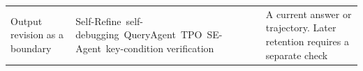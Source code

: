 \begin{longtable}{@{}>{\raggedright\arraybackslash}p{}>{\raggedright\arraybackslash}p{}>{\raggedright\arraybackslash}p{}@{}}
\addlinespace[8pt]
Output revision as a boundary & Self-Refine~\citep{madaan2023selfrefine}\newline self-debugging~\citep{chen2024teaching}\newline QueryAgent~\citep{huang-etal-2024-queryagent}\newline TPO~\citep{li2025testtime}\newline SE-Agent~\citep{guo2025seagent}\newline key-condition verification~\citep{wu-etal-2024-large} & A current answer or trajectory. Later retention requires a separate check \\
\end{longtable}
\endgroup
